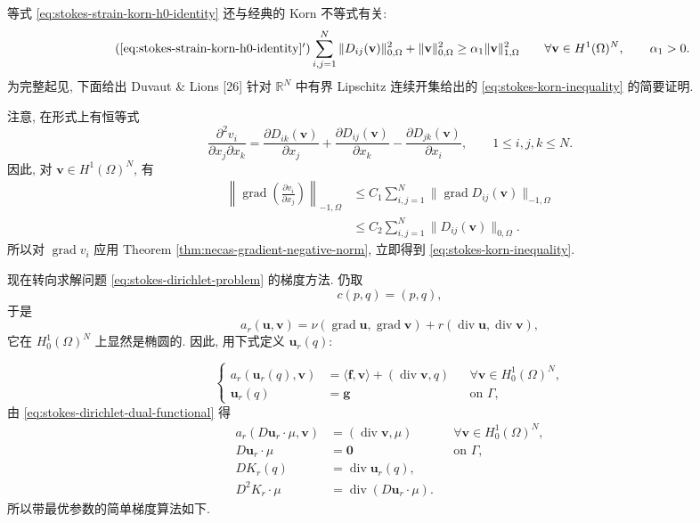 \setcounter{statement}{4}
\begin{Remark}\label{rem:stokes-korn-inequality}
等式 \eqref{eq:stokes-strain-korn-h0-identity} 还与经典的
Korn 不等式有关:
\begin{equation}\tag{\ref*{eq:stokes-strain-korn-h0-identity}$'$}
\label{eq:stokes-korn-inequality}
\sum_{i,j=1}^{N}
\|D_{ij}(\mathbf{v})\|_{0,\Omega}^2
+\|\mathbf{v}\|_{0,\Omega}^2
\ge
\alpha_1\|\mathbf{v}\|_{1,\Omega}^2
\qquad
\forall\mathbf{v}\in H^1(\Omega)^N,
\qquad \alpha_1>0.
\end{equation}
为完整起见, 下面给出 Duvaut \& Lions [26]
针对 $\mathbb{R}^N$ 中有界 Lipschitz 连续开集给出的
\eqref{eq:stokes-korn-inequality} 的简要证明.

注意, 在形式上有恒等式
\[
\frac{\partial^2v_i}{\partial x_j\partial x_k}
=
\frac{\partial D_{ik}(\mathbf{v})}{\partial x_j}
+\frac{\partial D_{ij}(\mathbf{v})}{\partial x_k}
-\frac{\partial D_{jk}(\mathbf{v})}{\partial x_i},
\qquad
1\le i,j,k\le N.
\]
因此, 对 $\mathbf{v}\in H^1(\Omega)^N$, 有
\[
\begin{aligned}
\left\|
\operatorname{grad}\left(
\frac{\partial v_i}{\partial x_j}
\right)
\right\|_{-1,\Omega}
&\le
C_1\sum_{i,j=1}^{N}
\|\operatorname{grad}D_{ij}(\mathbf{v})\|_{-1,\Omega}\\
&\le
C_2\sum_{i,j=1}^{N}
\|D_{ij}(\mathbf{v})\|_{0,\Omega}.
\end{aligned}
\]
所以对 $\operatorname{grad}v_i$ 应用 Theorem
\ref{thm:necas-gradient-negative-norm},
立即得到 \eqref{eq:stokes-korn-inequality}.
\end{Remark}

现在转向求解问题 \eqref{eq:stokes-dirichlet-problem} 的梯度方法.
仍取
\[
c(p,q)=(p,q),
\]
于是
\[
a_r(\mathbf{u},\mathbf{v})
=\nu(\operatorname{grad}\mathbf{u},
\operatorname{grad}\mathbf{v})
+r(\operatorname{div}\mathbf{u},
\operatorname{div}\mathbf{v}),
\]
它在 $H_0^1(\Omega)^N$ 上显然是椭圆的. 因此, 用下式定义
$\mathbf{u}_r(q)$:

\[
\left\{
\begin{aligned}
a_r(\mathbf{u}_r(q),\mathbf{v})
&=\langle\mathbf{f},\mathbf{v}\rangle
+(\operatorname{div}\mathbf{v},q)
&&\forall\mathbf{v}\in H_0^1(\Omega)^N,\\
\mathbf{u}_r(q)&=\mathbf{g}
&&\text{on }\Gamma,
\end{aligned}
\right.
\]
由 \eqref{eq:stokes-dirichlet-dual-functional} 得
\[
\begin{aligned}
a_r(D\mathbf{u}_r\cdot\mu,\mathbf{v})
&=(\operatorname{div}\mathbf{v},\mu)
&&\forall\mathbf{v}\in H_0^1(\Omega)^N,\\
D\mathbf{u}_r\cdot\mu&=\mathbf{0}
&&\text{on }\Gamma,\\
DK_r(q)&=\operatorname{div}\mathbf{u}_r(q),\\
D^2K_r\cdot\mu&=
\operatorname{div}(D\mathbf{u}_r\cdot\mu).
\end{aligned}
\]
所以带最优参数的简单梯度算法如下.

